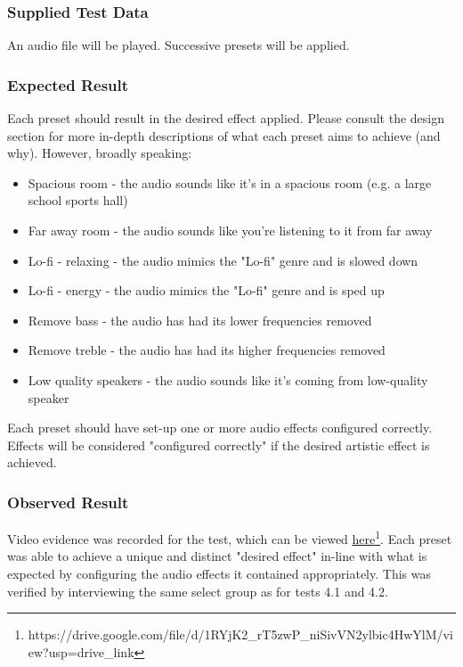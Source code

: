 \subsubsection*{Supplied Test Data}
An audio file will be played. Successive presets will be applied.

\subsubsection*{Expected Result}
Each preset should result in the desired effect applied. Please consult the design section for more in-depth descriptions of what each preset aims to achieve (and why). However, broadly speaking:
\begin{itemize}
	\item Spacious room - the audio sounds like it's in a spacious room (e.g. a large school sports hall)
	\item Far away room - the audio sounds like you're listening to it from far away
	\item Lo-fi - relaxing - the audio mimics the "Lo-fi" genre and is slowed down
	\item Lo-fi - energy - the audio mimics the "Lo-fi" genre and is sped up
	\item Remove bass - the audio has had its lower frequencies removed
	\item Remove treble - the audio has had its higher frequencies removed
	\item Low quality speakers - the audio sounds like it's coming from low-quality speaker
\end{itemize}
Each preset should have set-up one or more audio effects configured correctly. Effects will be considered "configured correctly" if the desired artistic effect is achieved.

\subsubsection*{Observed Result}
\label{sec:evidence5.4}
Video evidence was recorded for the test, which can be viewed \href{https://drive.google.com/file/d/1RYjK2_rT5zwP_niSivVN2ylbic4HwYlM/view?usp=drive_link}{here}\footnote{
	https://drive.google.com/file/d/1RYjK2\_rT5zwP\_niSivVN2ylbic4HwYlM/view?usp=drive\_link
}. Each preset was able to achieve a unique and distinct "desired effect" in-line with what is expected by configuring the audio effects it contained appropriately. This was verified by interviewing the same select group as for tests 4.1 and 4.2.

